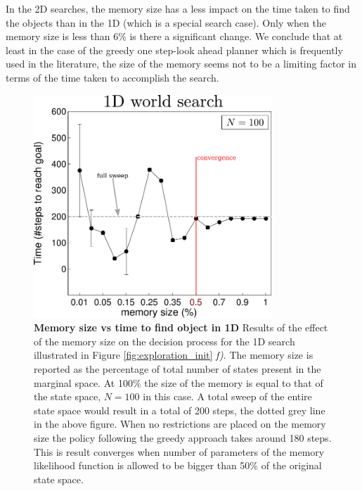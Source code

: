 In the 2D searches, the memory size has a less impact on the time taken to find the objects than in the 1D (which is a special search case). 
Only when the memory size is less than 6\% is there a significant change. We conclude that at least in the case of 
the greedy one step-look ahead planner which is frequently used in the literature, the size of the memory seems not to be a limiting factor in terms of the time taken to accomplish the search.

\begin{figure}	
  \centering
  \includegraphics[width=0.8\textwidth]{./ch5-MLMF/Figures/exper_mem_1d.pdf}
  \caption{\textbf{Memory size vs time to find object in 1D} Results of the effect of the memory size on the decision process
  for the 1D search illustrated in Figure \ref{fig:exploration_init} \textit{f)}.
  The memory size is reported as the percentage of total number of states present in the marginal space. At 100\% the size
  of the memory is equal to that of the state space, $N=100$ in this case. A total sweep of the entire state space would result in a total of 
  200 steps, the dotted grey line in the above figure. When no restrictions are placed on the memory size the policy following the greedy 
  approach takes around 180 steps. This is result converges when number of parameters of the memory likelihood function is allowed to be 
  bigger than 50\% of the original state space. } 
  \label{fig:time_to_reach_goal_1D}
\end{figure}


